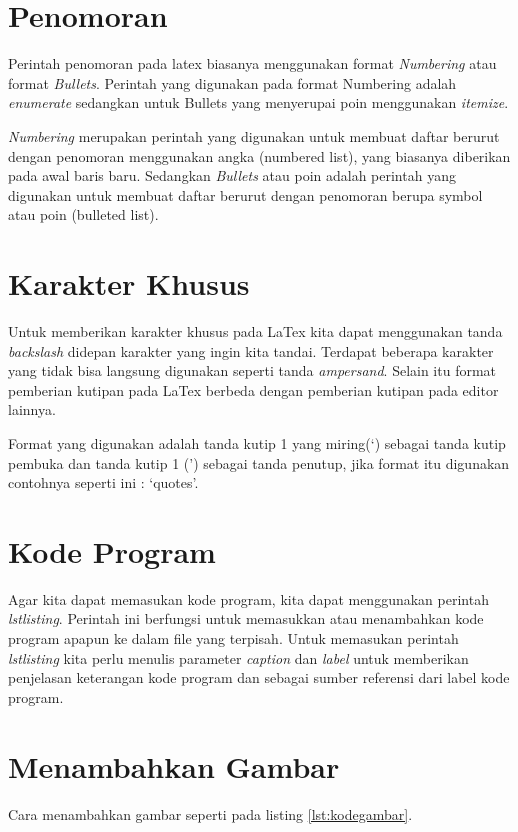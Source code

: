\section{Penomoran}
Perintah penomoran pada latex biasanya menggunakan format \textit{Numbering} atau format \textit{Bullets}. Perintah yang digunakan pada format Numbering adalah \textit{enumerate} sedangkan untuk Bullets yang menyerupai poin menggunakan \textit{itemize}.
\par \textit{Numbering} merupakan perintah yang digunakan untuk membuat daftar berurut dengan penomoran menggunakan angka (numbered list), yang biasanya diberikan pada awal baris baru. Sedangkan \textit{Bullets} atau poin adalah perintah yang digunakan untuk membuat daftar berurut dengan penomoran berupa symbol atau poin (bulleted list).

\section{Karakter Khusus}
Untuk memberikan karakter khusus pada LaTex kita dapat menggunakan tanda \textit{backslash} didepan karakter yang ingin kita tandai. Terdapat beberapa karakter yang tidak bisa langsung digunakan seperti tanda \textit{ampersand}. Selain itu format pemberian kutipan pada LaTex berbeda dengan pemberian kutipan pada editor lainnya.
\par Format yang digunakan adalah tanda kutip 1 yang miring(`) sebagai tanda kutip pembuka dan tanda kutip 1 (') sebagai tanda penutup, jika format itu digunakan contohnya seperti ini : `quotes'.


\section{Kode Program}
Agar kita dapat memasukan kode program, kita dapat menggunakan perintah \textit{lstlisting}. Perintah ini  berfungsi untuk memasukkan atau menambahkan kode program apapun ke dalam file yang terpisah. Untuk memasukan perintah \textit{lstlisting} kita perlu menulis parameter \textit{caption} dan \textit{label} untuk memberikan penjelasan keterangan kode program dan sebagai sumber referensi dari label kode program.



\section{Menambahkan Gambar}
Cara menambahkan gambar seperti pada listing \ref{lst:kodegambar}.



